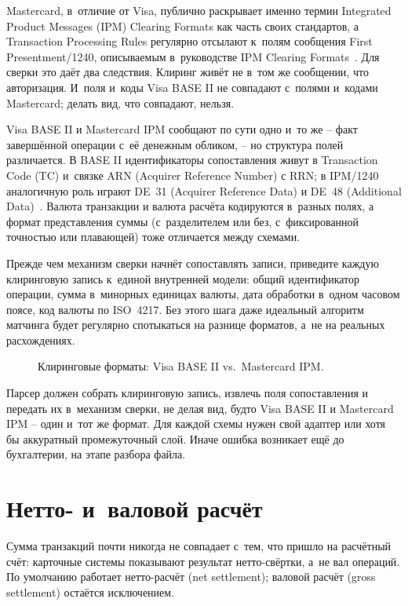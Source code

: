 Mastercard, в~отличие от Visa, публично раскрывает именно термин
Integrated Product Messages (IPM) Clearing Formats как часть своих
стандартов, а Transaction Processing Rules регулярно отсылают к~полям
сообщения First Presentment/1240, описываемым в~руководстве
IPM Clearing Formats~\cite{mc-pfmi-disclosure,mc-tpr}. Для сверки это
даёт два следствия. Клиринг живёт не в~том же сообщении, что авторизация.
И~поля и~коды Visa BASE II не совпадают с~полями и~кодами Mastercard;
делать вид, что совпадают, нельзя.

Visa BASE II и Mastercard IPM сообщают по сути одно и~то же -- факт
завершённой операции с~её денежным обликом, -- но структура полей
различается. В BASE II идентификаторы сопоставления живут
в Transaction Code (TC) и~связке ARN (Acquirer Reference Number)
с RRN; в IPM/1240 аналогичную роль играют DE~31 (Acquirer Reference
Data) и DE~48 (Additional Data)~\cite{visa-core-rules,mc-tpr}.
Валюта транзакции и валюта расчёта кодируются в~разных полях, а
формат представления суммы (с~разделителем или без, с~фиксированной
точностью или плавающей) тоже отличается между схемами.

Прежде чем механизм сверки начнёт сопоставлять записи, приведите каждую
клиринговую запись к~единой внутренней модели: общий идентификатор операции,
сумма в~минорных единицах валюты, дата обработки в~одном часовом
поясе, код валюты по ISO~4217. Без этого шага даже идеальный алгоритм
матчинга будет регулярно спотыкаться на разнице форматов, а~не на
реальных расхождениях.

\begin{figure}[tbp]
  \centering
  \caption{Клиринговые форматы: Visa BASE II vs.\ Mastercard IPM.}\label{fig:base2-vs-ipm}
\end{figure}

Парсер должен собрать клиринговую запись, извлечь поля сопоставления
и передать их в~механизм сверки, не делая вид, будто Visa BASE II
и Mastercard IPM -- один и~тот же формат. Для каждой схемы нужен свой адаптер или
хотя бы аккуратный промежуточный слой. Иначе ошибка возникает ещё до
бухгалтерии, на этапе разбора файла.

\section{Нетто- и~валовой расчёт}\label{sec:recon-net-vs-gross}

Сумма транзакций почти никогда не совпадает с~тем, что пришло на
расчётный счёт: карточные системы показывают результат
нетто-свёртки, а~не вал операций. По умолчанию работает
нетто-расчёт (net settlement); валовой расчёт (gross settlement)
остаётся исключением.

